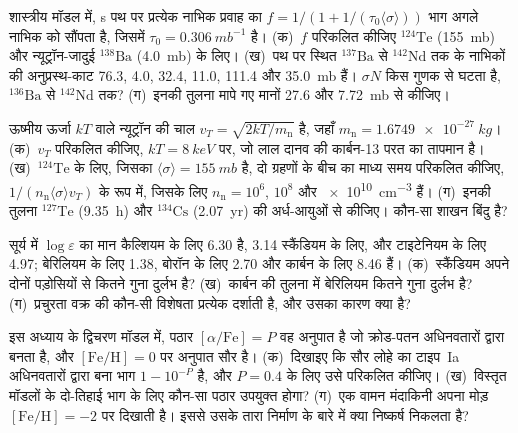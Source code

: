 \begin{exercise}[$\star\star$]\label{exo:b3:origin-of-elements:6}
शास्त्रीय मॉडल में, s पथ पर प्रत्येक नाभिक प्रवाह का
$f = 1/(1 + 1/(\tau_0\langle\sigma\rangle))$ भाग अगले नाभिक को सौंपता है,
जिसमें $\tau_0 = \qty{0.306}{mb^{-1}}$ है। (क)~$f$ परिकलित कीजिए
$^{124}\mathrm{Te}$ (\qty{155}{mb}) और न्यूट्रॉन-जादुई
$^{138}\mathrm{Ba}$ (\qty{4.0}{mb}) के लिए। (ख)~पथ पर स्थित $^{137}\mathrm{Ba}$ से
$^{142}\mathrm{Nd}$ तक के नाभिकों की
अनुप्रस्थ-काट \num{76.3}, \num{4.0}, \num{32.4}, \num{11.0},
\num{111.4} और \qty{35.0}{mb} हैं। $\sigma N$ किस गुणक से घटता है,
$^{136}\mathrm{Ba}$ से $^{142}\mathrm{Nd}$ तक? (ग)~इनकी तुलना
मापे गए मानों \num{27.6} और \qty{7.72}{mb} से कीजिए।
\end{exercise}

\begin{exercise}[$\star\star$]\label{exo:b3:origin-of-elements:7}
ऊष्मीय ऊर्जा $kT$ वाले न्यूट्रॉन की चाल
$v_T = \sqrt{2kT/m_\mathrm{n}}$ है, जहाँ $m_\mathrm{n} = \qty{1.6749e-27}{kg}$।
(क)~$v_T$ परिकलित कीजिए, $kT = \qty{8}{keV}$ पर, जो लाल दानव की
कार्बन-13 परत का तापमान है। (ख)~$^{124}\mathrm{Te}$ के लिए, जिसका
$\langle\sigma\rangle = \qty{155}{mb}$ है, दो ग्रहणों के बीच का माध्य समय परिकलित कीजिए,
$1/(n_\mathrm{n}\langle\sigma\rangle v_T)$ के रूप में, जिसके लिए
$n_\mathrm{n} = 10^6$, $10^8$ और \qty{e10}{cm^{-3}} हैं। (ग)~इनकी तुलना
$^{127}\mathrm{Te}$ (\qty{9.35}{h}) और
$^{134}\mathrm{Cs}$ (\qty{2.07}{yr}) की अर्ध-आयुओं से कीजिए। कौन-सा शाखन बिंदु है?
\end{exercise}

\begin{exercise}[$\star\star$]\label{exo:b3:origin-of-elements:8}
सूर्य में $\log\varepsilon$ का मान कैल्शियम के लिए \num{6.30} है, \num{3.14}
स्कैंडियम के लिए, और टाइटेनियम के लिए \num{4.97}; बेरिलियम के लिए \num{1.38},
बोरॉन के लिए \num{2.70} और कार्बन के लिए \num{8.46} हैं। (क)~स्कैंडियम
अपने दोनों पड़ोसियों से कितने गुना दुर्लभ है? (ख)~कार्बन की तुलना में बेरिलियम
कितने गुना दुर्लभ है? (ग)~प्रचुरता वक्र की कौन-सी
विशेषता प्रत्येक दर्शाती है, और उसका कारण क्या है?
\end{exercise}

\begin{exercise}[$\star\star$]\label{exo:b3:origin-of-elements:9}
इस अध्याय के द्विचरण मॉडल में, पठार
$[\alpha/\mathrm{Fe}] = P$ वह अनुपात है जो क्रोड-पतन अधिनवतारों द्वारा बनता है,
और $[\mathrm{Fe/H}] = 0$ पर अनुपात सौर है। (क)~दिखाइए कि
सौर लोहे का टाइप~Ia अधिनवतारों द्वारा बना भाग $1 - 10^{-P}$ है, और
$P = 0.4$ के लिए उसे परिकलित कीजिए। (ख)~विस्तृत मॉडलों के
दो-तिहाई भाग के लिए कौन-सा पठार उपयुक्त होगा? (ग)~एक वामन मंदाकिनी अपना मोड़
$[\mathrm{Fe/H}] = -2$ पर दिखाती है। इससे उसके तारा निर्माण के बारे में क्या निष्कर्ष निकलता है?
\end{exercise}

